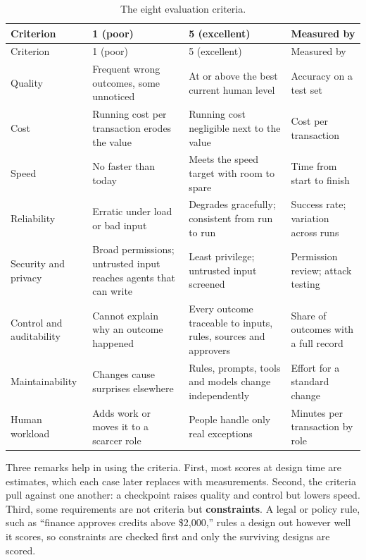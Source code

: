 \begingroup
\small
\begin{xltabular}{\textwidth}{@{}>{\raggedright\arraybackslash}p{2.4cm}>{\raggedright\arraybackslash}X>{\raggedright\arraybackslash}X>{\raggedright\arraybackslash}p{3.0cm}@{}}
\caption{The eight evaluation criteria.}\label{tab:criteria}\\
\toprule
{} Criterion & 1 (poor) & 5 (excellent) & Measured by \\
\midrule
\endfirsthead
\toprule
{} Criterion & 1 (poor) & 5 (excellent) & Measured by \\
\midrule
\endhead
Quality & Frequent wrong outcomes, some unnoticed & At or above the best current human level & Accuracy on a test set \\
Cost & Running cost per transaction erodes the value & Running cost negligible next to the value & Cost per transaction \\
Speed & No faster than today & Meets the speed target with room to spare & Time from start to finish \\
Reliability & Erratic under load or bad input & Degrades gracefully; consistent from run to run & Success rate; variation across runs \\
Security and privacy & Broad permissions; untrusted input reaches agents that can write & Least privilege; untrusted input screened & Permission review; attack testing \\
Control and auditability & Cannot explain why an outcome happened & Every outcome traceable to inputs, rules, sources and approvers & Share of outcomes with a full record \\
Maintainability & Changes cause surprises elsewhere & Rules, prompts, tools and models change independently & Effort for a standard change \\
Human workload & Adds work or moves it to a scarcer role & People handle only real exceptions & Minutes per transaction by role \\
\bottomrule
\end{xltabular}
\endgroup

Three remarks help in using the criteria. First, most scores at design time are estimates, which each case later replaces with measurements. Second, the criteria pull against one another: a checkpoint raises quality and control but lowers speed. Third, some requirements are not criteria but \textbf{constraints}. A legal or policy rule, such as ``finance approves credits above \$2{,}000,'' rules a design out however well it scores, so constraints are checked first and only the surviving designs are scored.

